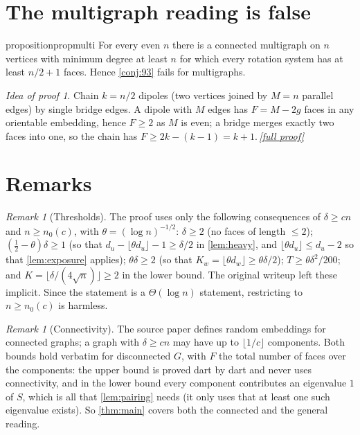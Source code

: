 \documentclass[11pt,a4paper]{article}
\theoremstyle{plain}
\theoremstyle{definition}
\theoremstyle{remark}
\newtheorem{remark}[theorem]{Remark}
\newtheorem*{proofidea}{Idea of proof}
\newcommand{\fullproofref}[1]{\,\hyperref[#1]{\textit{[full proof]}}}
\begin{document}
\section{The multigraph reading is false}\label{sec:multi}

\begin{restatable}{proposition}{propmulti}\label{prop:multi}
For every even $n$ there is a connected multigraph on $n$ vertices with minimum degree at least $n$ for which every rotation system has at least $n/2+1$ faces. Hence \cref{conj:93} fails for multigraphs.
\end{restatable}
\begin{proofidea}
Chain $k=n/2$ dipoles (two vertices joined by $M=n$ parallel edges) by single bridge edges. A dipole with $M$ edges has $F=M-2g$ faces in any orientable embedding, hence $F\ge2$ as $M$ is even; a bridge merges exactly two faces into one, so the chain has $F\ge2k-(k-1)=k+1$.\fullproofref{pf:multi}
\end{proofidea}

\section{Remarks}\label{sec:remarks}

\begin{remark}[Thresholds]\label{rem:thresholds}
The proof uses only the following consequences of $\delta\ge cn$ and $n\ge n_0(c)$, with $\theta=(\log n)^{-1/2}$: $\delta\ge2$ (no faces of length $\le2$); $(\tfrac12-\theta)\delta\ge1$ (so that $d_u-\lfloor\theta d_u\rfloor-1\ge\delta/2$ in \cref{lem:heavy}, and $\lfloor\theta d_u\rfloor\le d_u-2$ so that \cref{lem:exposure} applies); $\theta\delta\ge2$ (so that $K_w=\lfloor\theta d_w\rfloor\ge\theta\delta/2$); $T\ge\theta\delta^2/200$; and $K=\lfloor\delta/(4\sqrt n)\rfloor\ge2$ in the lower bound. The original writeup left these implicit. Since the statement is a $\Theta(\log n)$ statement, restricting to $n\ge n_0(c)$ is harmless.
\end{remark}

\begin{remark}[Connectivity]\label{rem:connected}
The source paper defines random embeddings for connected graphs; a graph with $\delta\ge cn$ may have up to $\lfloor1/c\rfloor$ components. Both bounds hold verbatim for disconnected $G$, with $F$ the total number of faces over the components: the upper bound is proved dart by dart and never uses connectivity, and in the lower bound every component contributes an eigenvalue $1$ of $S$, which is all that \cref{lem:pairing} needs (it only uses that at least one such eigenvalue exists). So \cref{thm:main} covers both the connected and the general reading.
\end{remark}
\end{document}
